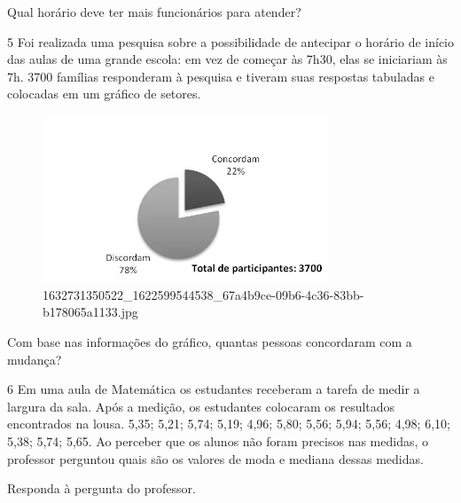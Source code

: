 {{{\begin{escolha}
{{{{{\begin{escolha}
\begin{escolha}
{\begin{q°}

Qual horário deve ter mais funcionários para atender?



\num{5} Foi realizada uma pesquisa sobre a possibilidade de antecipar o horário
de início das aulas de uma grande escola: em vez de começar às 7h30, elas se iniciariam
às 7h. 3700 famílias responderam à pesquisa e tiveram suas respostas tabuladas e
colocadas em um gráfico de setores.

\begin{figure}
\centering
\includegraphics[width=3.34677in,height=1.96063in]{./_SAEB_9_MAT/media/image215.jpg}
\caption{1632731350522\_1622599544538\_67a4b9ce-09b6-4c36-83bb-b178065a1133.jpg}
\end{figure}


Com base nas informações do gráfico, quantas pessoas concordaram com a mudança?



\num{6} Em uma aula de Matemática os estudantes receberam a tarefa de medir a
largura da sala. Após a medição, os estudantes colocaram os resultados
encontrados na lousa. 5,35; 5,21; 5,74; 5,19; 4,96; 5,80; 5,56; 5,94; 5,56; 
4,98; 6,10; 5,38; 5,74; 5,65. Ao perceber que os alunos não foram precisos nas
medidas, o professor perguntou quais são os valores de moda e mediana dessas medidas.

Responda à pergunta do professor.


\end{q°}}
\end{escolha}
\end{escolha}}}}}}
\end{escolha}}}}
